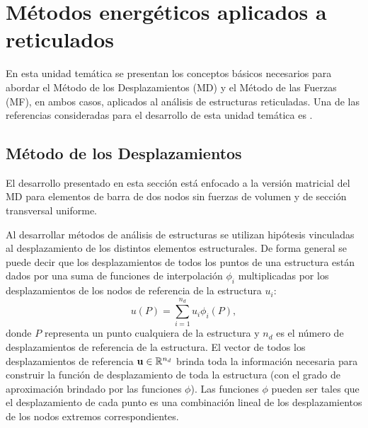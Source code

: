 %
%
%

\chapter[Métodos energéticos aplicados a reticulados]{Métodos energéticos aplicados a reticulados}

En esta unidad temática se presentan los conceptos básicos necesarios para abordar el Método de los Desplazamientos (MD) y el Método de las Fuerzas (MF), en ambos casos, aplicados al análisis de estructuras reticuladas. %
%
Una de las referencias consideradas para el desarrollo de esta unidad temática es \citep{Reddy2002b}. %



\section{Método de los Desplazamientos}

El desarrollo presentado en esta sección está enfocado a la versión matricial del MD para elementos de barra de dos nodos sin fuerzas de volumen y de sección transversal uniforme. %
%

Al desarrollar métodos de análisis de estructuras se utilizan hipótesis vinculadas al desplazamiento de los distintos elementos estructurales. %
De forma general se puede decir que los desplazamientos de todos los puntos de una estructura están dados por una suma de funciones de interpolación $\phi_i$ multiplicadas por los desplazamientos de los nodos de referencia de la estructura $u_i$:
%
\begin{equation}
u(P) = \sum_{i=1}^{n_d} u_i \phi_i(P),
\end{equation}
%
donde $P$ representa un punto cualquiera de la estructura y $n_d$ es el número de desplazamientos de referencia de la estructura. %
%
El vector de todos los desplazamientos de referencia ${\bf u} \in {\mathbb R}^{n_d}$ brinda toda la información necesaria para construir la función de desplazamiento de toda la estructura (con el grado de aproximación brindado por las funciones $\phi$). %
%
Las funciones $\phi$ pueden ser tales que el desplazamiento de cada punto es una combinación lineal de los desplazamientos de los nodos extremos correspondientes.


